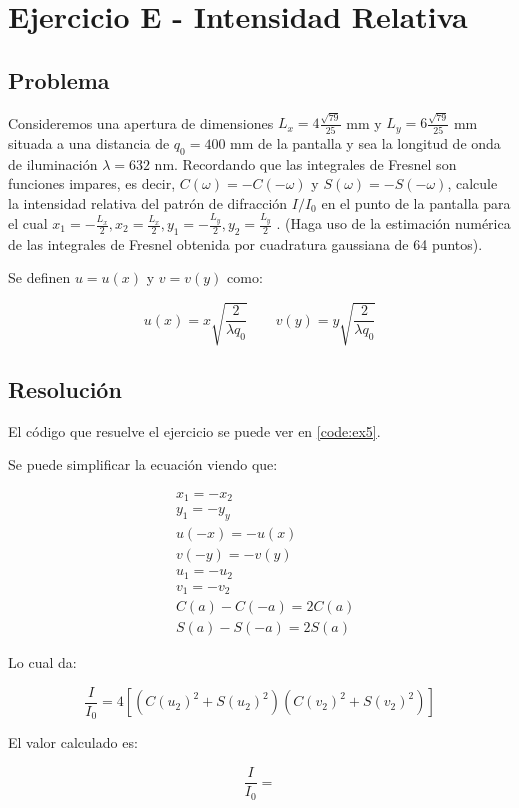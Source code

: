 \section{Ejercicio E - Intensidad Relativa}

\subsection{Problema}

Consideremos una apertura de dimensiones 
$L_x = 4\frac{\sqrt{79}}{25}$ mm y $L_y = 6\frac{\sqrt{79}}{25}$ mm situada a una distancia de $q_0 = 400$ mm de la pantalla y sea la longitud de onda de iluminación $\lambda = 632$ nm. 
Recordando que las integrales de Fresnel son funciones impares, es decir, $C(\omega) = -C(-\omega)$ y $S(\omega) = -S(-\omega)$, calcule la intensidad relativa del patrón de difracción $I/I_0$ en el punto de la pantalla para el cual $x_1 = - \frac{L_x}{2}, x_2 = \frac{L_x}{2} , y_1 = -\frac{L_y}{2} , y_2 = \frac{L_y}{2}$ . (Haga uso de la estimación numérica de las integrales de Fresnel obtenida por cuadratura gaussiana de 64 puntos).

Se definen $u = u(x)$ y $v = v(y)$ como:

$$
	u(x) = x \sqrt{\frac{2}{\lambda q_0}} \ \ \ \ \ \ \ \ \ 
	v(y) = y \sqrt{\frac{2}{\lambda q_0}}
$$

\subsection{Resolución}


El código que resuelve el ejercicio se puede ver en \ref{code:ex5}. 

Se puede simplificar la ecuación viendo que:

\begin{align*}
	&x_1 = -x_2 \\
	&y_1 = -y_y \\ 
	&u(-x) = -u(x) \\
	&v(-y) = -v(y) \\ 
	&u_1 = -u_2 \\
	&v_1 = -v_2 \\
	&C(a) - C(-a) = 2C(a) \\
	&S(a) - S(-a) = 2S(a)
\end{align*}

Lo cual da:

$$
\frac{I}{I_0} = 4 [
(	C(u_2) ^2 + S(u_2)^2)
(	C(v_2) ^2 + S(v_2)^2)
]
$$

El valor calculado es: 

$$\frac{I}{I_0}  = $$


